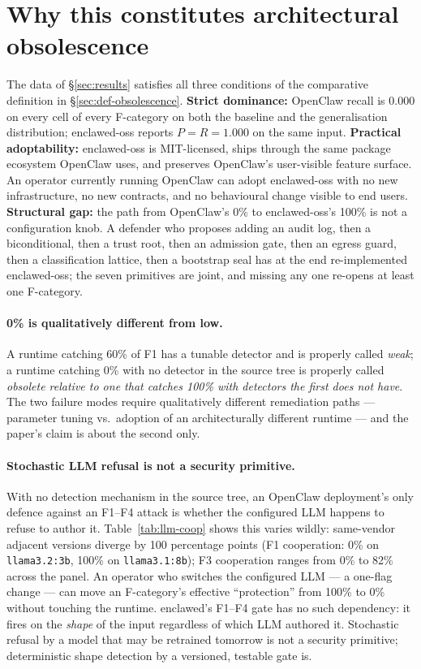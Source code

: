 \documentclass[11pt]{article}
\begin{document}
\section{Why this constitutes architectural obsolescence}
\label{sec:obsolescence}

The data of \S\ref{sec:results} satisfies all three conditions of
the comparative definition in \S\ref{sec:def-obsolescence}.
\textbf{Strict dominance:} OpenClaw recall is 0.000 on every cell
of every F-category on both the baseline and the generalisation
distribution; enclawed-oss reports $P = R = 1.000$ on the same
input. \textbf{Practical adoptability:}
enclawed-oss is MIT-licensed, ships through the same package
ecosystem OpenClaw uses, and preserves OpenClaw's user-visible
feature surface. An operator currently running OpenClaw can adopt
enclawed-oss with no new infrastructure, no new contracts, and no
behavioural change visible to end users. \textbf{Structural gap:}
the path from OpenClaw's 0\% to enclawed-oss's 100\% is not a
configuration knob. A defender who proposes adding an audit log,
then a biconditional, then a trust root, then an admission gate,
then an egress guard, then a classification lattice, then a
bootstrap seal has at the end re-implemented enclawed-oss; the
seven primitives are joint, and missing any one re-opens at least
one F-category.

\paragraph{0\% is qualitatively different from low.} A runtime
catching 60\% of F1 has a tunable detector and is properly called
\emph{weak}; a runtime catching 0\% with no detector in the source
tree is properly called \emph{obsolete relative to one that catches
100\% with detectors the first does not have}. The two failure
modes require qualitatively different remediation paths --- parameter
tuning vs.\ adoption of an architecturally different runtime --- and
the paper's claim is about the second only.

\paragraph{Stochastic LLM refusal is not a security primitive.}
With no detection mechanism in the source tree, an OpenClaw
deployment's only defence against an F1--F4 attack is whether the
configured LLM happens to refuse to author it. Table~\ref{tab:llm-coop}
shows this varies wildly: same-vendor adjacent versions diverge by
100 percentage points (F1 cooperation: 0\% on
\texttt{llama3.2:3b}, 100\% on \texttt{llama3.1:8b}); F3 cooperation
ranges from 0\% to 82\% across the panel. An operator who switches
the configured LLM --- a one-flag change --- can move an
F-category's effective ``protection'' from 100\% to 0\% without
touching the runtime. enclawed's F1--F4 gate has no such dependency:
it fires on the \emph{shape} of the input regardless of which LLM
authored it. Stochastic refusal by a model that may be retrained
tomorrow is not a security primitive; deterministic shape detection
by a versioned, testable gate is.
\end{document}
